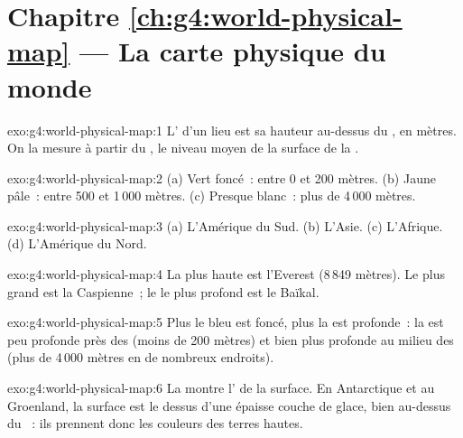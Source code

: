 \section*{Chapitre \ref{ch:g4:world-physical-map} --- La carte physique du monde}

\begin{solution}{exo:g4:world-physical-map:1}
L' d'un lieu est sa hauteur au-dessus du , en
mètres. On la mesure à partir du , le niveau moyen de la
surface de la .
\end{solution}

\begin{solution}{exo:g4:world-physical-map:2}
(a) Vert foncé~: entre 0 et 200 mètres. (b) Jaune pâle~: entre 500 et
1\,000 mètres. (c) Presque blanc~: plus de 4\,000 mètres.
\end{solution}

\begin{solution}{exo:g4:world-physical-map:3}
(a) L'Amérique du Sud. (b) L'Asie. (c) L'Afrique. (d) L'Amérique du Nord.
\end{solution}

\begin{solution}{exo:g4:world-physical-map:4}
La plus haute  est l'Everest (8\,849 mètres). Le plus grand  est
la  Caspienne~; le  le plus profond est le  Baïkal.
\end{solution}

\begin{solution}{exo:g4:world-physical-map:5}
Plus le bleu est foncé, plus la  est profonde~: la  est peu profonde
près des  (moins de 200 mètres) et bien plus profonde au milieu des
 (plus de 4\,000 mètres en de nombreux endroits).
\end{solution}

\begin{solution}{exo:g4:world-physical-map:6}
La  montre l' de la surface. En Antarctique et au
Groenland, la surface est le dessus d'une épaisse couche de glace, bien
au-dessus du ~: ils prennent donc les couleurs des terres
hautes.
\end{solution}

